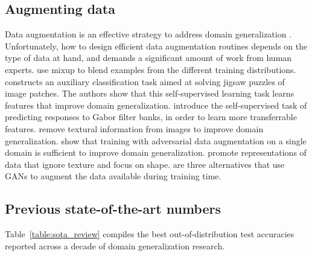 \documentclass{article}
\begin{document}
\subsection{Augmenting data}

Data augmentation is an effective strategy to address domain generalization \citep{zhang2019unseen}. Unfortunately, how to design efficient data augmentation routines depends on the type of data at hand, and demands a significant amount of work from human experts.
%
\citet{xu2019adversarial, yan2020improve, wang2020h} use mixup \citep{zhang2017mixup} to blend examples from the different training distributions.
%
\citet{carlucci2019domain} constructs an auxiliary classification task aimed at solving jigsaw puzzles of image patches. The authors show that this self-supervised learning task learns features that improve domain generalization.
%
\citet{albuquerque2020i} introduce the self-supervised task of predicting responses to Gabor filter banks, in order to learn more transferrable features.
%
\citet{wang2019learning} remove textural information from images to improve domain generalization.
%
\citet{volpi2018generalizing} show that training with adversarial data augmentation on a single domain is sufficient to improve domain generalization.
%
\citet{nam2019reducing, asadi2019towards} promote representations of data that ignore texture and focus on shape.
%
\citet{rahman2019multi, zhou2020deep, carlucci2019domain} are three alternatives that use GANs to augment the data available during training time.


\subsection{Previous state-of-the-art numbers}
\label{app:sota_review}

Table~\ref{table:sota_review} compiles the best out-of-distribution test accuracies reported across a decade of domain generalization research.
\end{document}
